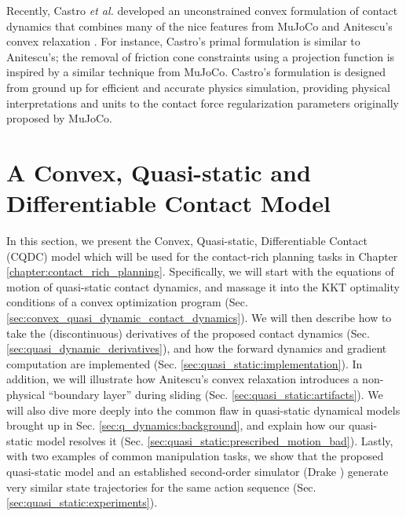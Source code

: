 Recently, Castro \textit{et al.} developed an unconstrained convex formulation of contact dynamics \cite{castro2021unconstrained} that combines many of the nice features from MuJoCo \cite{todorov2012mujoco} and Anitescu's convex relaxation \cite{anitescu2006optimization}. For instance, Castro's primal formulation is similar to Anitescu's; the removal of friction cone constraints using a projection function is inspired by a similar technique from MuJoCo. 
Castro's formulation is designed from ground up for efficient and accurate physics simulation, providing physical interpretations and units to the contact force regularization parameters originally proposed by MuJoCo.


\section{A Convex, Quasi-static and Differentiable Contact Model} \label{sec:q_dynamics:cqdc}
In this section, we present the Convex, Quasi-static, Differentiable Contact (CQDC) model which will be used for the contact-rich planning tasks in Chapter \ref{chapter:contact_rich_planning}. Specifically, we will start with the equations of motion of quasi-static contact dynamics, and massage it into the KKT optimality conditions of a convex optimization program (Sec. \ref{sec:convex_quasi_dynamic_contact_dynamics}). We will then describe how to take the (discontinuous) derivatives of the proposed contact dynamics (Sec. \ref{sec:quasi_dynamic_derivatives}), and how the forward dynamics and gradient computation are implemented (Sec. \ref{sec:quasi_static:implementation}). In addition, we will illustrate how Anitescu's convex relaxation introduces a non-physical ``boundary layer'' during sliding (Sec. \ref{sec:quasi_static:artifacts}). We will also dive more deeply into the common flaw in quasi-static dynamical models brought up in Sec. \ref{sec:q_dynamics:background}, and explain how our quasi-static model resolves it (Sec. \ref{sec:quasi_static:prescribed_motion_bad}). Lastly, with two examples of common manipulation tasks, we show that the proposed quasi-static model and an established second-order simulator (Drake \cite{drake}) generate very similar state trajectories for the same action sequence (Sec. \ref{sec:quasi_static:experiments}). 

